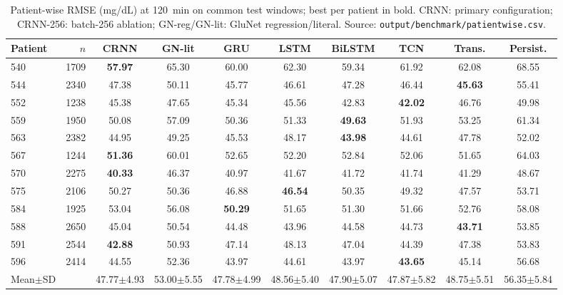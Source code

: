 \begin{table}[t]\centering
\caption{Patient-wise RMSE (mg/dL) at 120~min on common test windows; best per patient in bold. CRNN: primary configuration; CRNN-256: batch-256 ablation; GN-reg/GN-lit: GluNet regression/literal. Source: \texttt{output/benchmark/patientwise.csv}.}
\scriptsize\setlength{\tabcolsep}{3pt}
\begin{tabular}{lrcccccccc}\toprule
Patient & $n$ & CRNN & GN-lit & GRU & LSTM & BiLSTM & TCN & Trans. & Persist.\\\midrule
540 & 1709 & \textbf{57.97} & 65.30 & 60.00 & 62.30 & 59.34 & 61.92 & 62.08 & 68.55\\
544 & 2340 & 47.38 & 50.11 & 45.77 & 46.61 & 47.28 & 46.44 & \textbf{45.63} & 55.41\\
552 & 1238 & 45.38 & 47.65 & 45.34 & 45.56 & 42.83 & \textbf{42.02} & 46.76 & 49.98\\
559 & 1950 & 50.08 & 57.09 & 50.36 & 51.33 & \textbf{49.63} & 51.93 & 53.25 & 61.34\\
563 & 2382 & 44.95 & 49.25 & 45.53 & 48.17 & \textbf{43.98} & 44.61 & 47.78 & 52.02\\
567 & 1244 & \textbf{51.36} & 60.01 & 52.65 & 52.20 & 52.84 & 52.06 & 51.65 & 64.03\\
570 & 2275 & \textbf{40.33} & 46.37 & 40.97 & 41.67 & 41.72 & 41.74 & 41.29 & 48.67\\
575 & 2106 & 50.27 & 50.36 & 46.88 & \textbf{46.54} & 50.35 & 49.32 & 47.57 & 53.71\\
584 & 1925 & 53.04 & 56.08 & \textbf{50.29} & 51.65 & 51.30 & 51.66 & 52.76 & 58.08\\
588 & 2650 & 45.04 & 50.54 & 44.48 & 43.96 & 44.58 & 44.73 & \textbf{43.71} & 53.85\\
591 & 2544 & \textbf{42.88} & 50.93 & 47.14 & 48.13 & 47.04 & 44.39 & 47.38 & 53.83\\
596 & 2414 & 44.55 & 52.36 & 43.97 & 44.61 & 43.97 & \textbf{43.65} & 45.14 & 56.68\\
\midrule
Mean$\pm$SD & & 47.77$\pm$4.93 & 53.00$\pm$5.55 & 47.78$\pm$4.99 & 48.56$\pm$5.40 & 47.90$\pm$5.07 & 47.87$\pm$5.82 & 48.75$\pm$5.51 & 56.35$\pm$5.84\\
\bottomrule
\end{tabular}\end{table}
